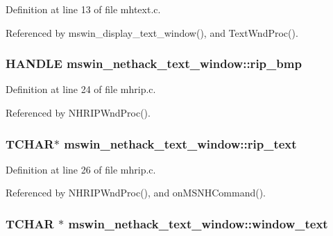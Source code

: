 Definition at line 13 of file mhtext.\+c.



Referenced by mswin\+\_\+display\+\_\+text\+\_\+window(), and Text\+Wnd\+Proc().

\hypertarget{structmswin__nethack__text__window_a036fad5d1b1b14381da83f420e320ab2}{
\subsubsection[{rip\+\_\+bmp}]{\setlength{\rightskip}{0pt plus 5cm}H\+A\+N\+D\+L\+E mswin\+\_\+nethack\+\_\+text\+\_\+window\+::rip\+\_\+bmp}}\label{structmswin__nethack__text__window_a036fad5d1b1b14381da83f420e320ab2}


Definition at line 24 of file mhrip.\+c.



Referenced by N\+H\+R\+I\+P\+Wnd\+Proc().

\hypertarget{structmswin__nethack__text__window_af374dae4520a7ffae334d26ea9d86bce}{
\subsubsection[{rip\+\_\+text}]{\setlength{\rightskip}{0pt plus 5cm}T\+C\+H\+A\+R$\ast$ mswin\+\_\+nethack\+\_\+text\+\_\+window\+::rip\+\_\+text}}\label{structmswin__nethack__text__window_af374dae4520a7ffae334d26ea9d86bce}


Definition at line 26 of file mhrip.\+c.



Referenced by N\+H\+R\+I\+P\+Wnd\+Proc(), and on\+M\+S\+N\+H\+Command().

\hypertarget{structmswin__nethack__text__window_a103624299b7831b14459a3a7b47c0271}{
\subsubsection[{window\+\_\+text}]{\setlength{\rightskip}{0pt plus 5cm}T\+C\+H\+A\+R $\ast$ mswin\+\_\+nethack\+\_\+text\+\_\+window\+::window\+\_\+text}}\label{structmswin__nethack__text__window_a103624299b7831b14459a3a7b47c0271}


